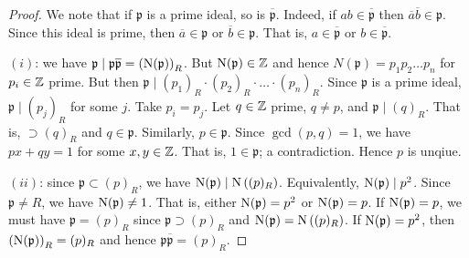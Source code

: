 \begin{proof}
    We note that if \(\mathfrak p\) is a prime ideal, so is
    \(\overline{\mathfrak p}\).
    Indeed, if \(ab \in \overline{\mathfrak p}\) then
    \(\overline a \overline b \in \mathfrak p\).
    Since this ideal is prime, then
    \(\overline a \in \mathfrak p\)
    or \(\overline b \in \mathfrak p\).
    That is,
    \(a \in \overline{\mathfrak p}\)
    or \(b \in \overline{\mathfrak p}\).

    $(i)$: we have 
    $\mathfrak p \mid \mathfrak p \overline{\mathfrak p} =
    \left( \operatorname{N}(\mathfrak p) \right)_R$.
    But \(\operatorname{N}(\mathfrak p) \in \mathbb{Z}\) and hence
    $N(\mathfrak p) = p_1 p_2 \ldots p_n$
    for $p_i \in \mathbb{Z}$ prime.
    But then 
    $\mathfrak p \mid (p_1)_R \cdot (p_2)_R \cdot \ldots \cdot (p_n)_R$.
    Since $\mathfrak p$ is a prime ideal, $\mathfrak p \mid (p_j)_R$ for some
    $j$.
    Take $p_i = p_j$.
    Let $q \in \mathbb{Z}$ prime, $q \neq p$, and $\mathfrak p \mid (q)_R$.
    That is, $\mathfrak \supset (q)_R$ and $q \in \mathfrak p$.
    Similarly, $p \in \mathfrak p$.
    Since $\gcd(p, q) = 1$, we have $px + qy = 1$ for some $x, y \in \mathbb{Z}$.
    That is, 
    $1 \in \mathfrak p$; a contradiction.
    Hence $p$ is unqiue.
    
    $(ii)$: since $\mathfrak p \subset (p)_R$, we have
    $\operatorname{N}(\mathfrak p) \mid \operatorname{N}\left( (p)_R \right)$.
    Equivalently,
    $\operatorname{N}(\mathfrak p) \mid p^2$.
    Since $\mathfrak p \neq R$, we have
    $\operatorname{N}(\mathfrak p) \neq 1$.
    That is, either $\operatorname{N}(\mathfrak p) = p^2$ or
    $\operatorname{N}(\mathfrak p) = p$.
    If $\operatorname{N}(\mathfrak p) = p$, we must have $\mathfrak p = (p)_R$
    since $\mathfrak p \supset (p)_R$ and 
    $\operatorname{N}(\mathfrak p) = \operatorname{N}\left( (p)_R \right)$.
    If $\operatorname{N}(\mathfrak p) = p^2$, then
    $\left( \operatorname{N}(\mathfrak p) \right)_R = (p)_R$
    and hence $\mathfrak p \overline{\mathfrak p} = (p)_R$.
\end{proof}